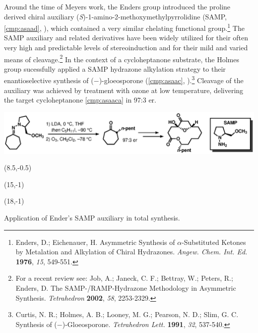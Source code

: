  Around the time of Meyers work, the Enders group introduced the proline derived chiral auxiliary
 (\textit{S})-1-amino-2-methoxymethylpyrrolidine (SAMP, \ref{cmp:asaad}, ), which
 contained a very similar chelating functional group.\footnote{{\frenchspacing Enders, D.; Eichenauer, H.
 Asymmetric Synthesis of $\alpha$-Substituted Ketones by Metalation and Alkylation of Chiral Hydrazones. \textit{Angew.
 Chem. Int. Ed.} \textbf{1976}, \textit{15}, 549-551.}} The SAMP auxiliary and related derivatives
 have been widely utilized for their often very high and predictable levels of stereoinduction and
 for their mild and varied means of cleavage.\footnote{For a recent review see: {\frenchspacing Job, A.; Janeck, C. F.; Bettray, W.;
 Peters, R.; Enders, D. The SAMP-/RAMP-Hydrazone Methodology in Asymmetric Synthesis.
 \textit{Tetrahedron} \textbf{2002}, \textit{58}, 2253-2329.}} In the context of a cycloheptanone
 substrate, the Holmes group sucessfully applied a SAMP hydrazone alkylation strategy to their
 enantioselective synthesis of ($-$)-gloeosporone
 (\ce{->}\ref{cmp:asaac}, ).\footnote{{\frenchspacing Curtis, N.
 R.; Holmes, A. B.; Looney, M. G.; Pearson, N. D.; Slim, G. C. Synthesis of ($-$)-Gloeosporone.
 \textit{Tetrahedron Lett.} \textbf{1991}, \textit{32}, 537-540.}} Cleavage of the auxiliary was
 achieved by treatment with ozone at low temperature, delivering the target cycloheptanone
 \ref{cmp:asaaca} in 97:3 er. 
 \begin{Scheme}[t]
  \centering
  \includegraphics[scale=0.8]{chp_asymmetric/images/samp}
  \begin{textblock}{1}(8.5,-0.5)  \end{textblock}
  \begin{textblock}{1}(15,-1)  \end{textblock}
  \begin{textblock}{1}(18,-1)  \end{textblock}
  \caption{Application of Ender's SAMP auxiliary in total synthesis.}
  \label{sch:assamp}
\end{Scheme}   
 
